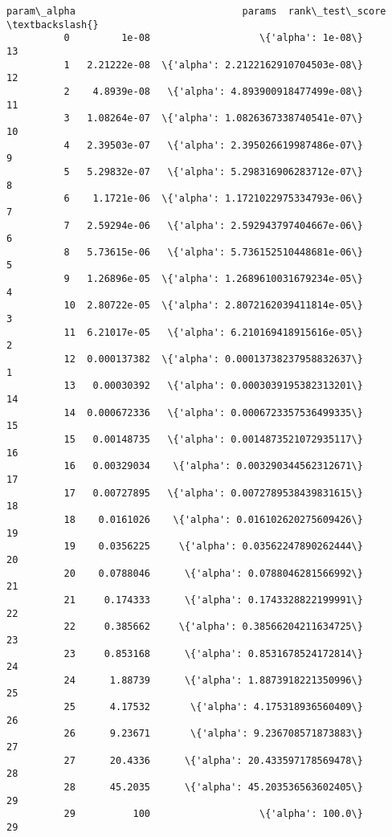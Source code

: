 \documentclass[11pt]{article}
\begin{document}
\begin{Verbatim}[commandchars=\\\{\}]
              param\_alpha                             params  rank\_test\_score  \textbackslash{}
          0         1e-08                   \{'alpha': 1e-08\}               13   
          1   2.21222e-08  \{'alpha': 2.2122162910704503e-08\}               12   
          2    4.8939e-08   \{'alpha': 4.893900918477499e-08\}               11   
          3   1.08264e-07  \{'alpha': 1.0826367338740541e-07\}               10   
          4   2.39503e-07   \{'alpha': 2.395026619987486e-07\}                9   
          5   5.29832e-07   \{'alpha': 5.298316906283712e-07\}                8   
          6    1.1721e-06  \{'alpha': 1.1721022975334793e-06\}                7   
          7   2.59294e-06   \{'alpha': 2.592943797404667e-06\}                6   
          8   5.73615e-06   \{'alpha': 5.736152510448681e-06\}                5   
          9   1.26896e-05  \{'alpha': 1.2689610031679234e-05\}                4   
          10  2.80722e-05  \{'alpha': 2.8072162039411814e-05\}                3   
          11  6.21017e-05   \{'alpha': 6.210169418915616e-05\}                2   
          12  0.000137382  \{'alpha': 0.00013738237958832637\}                1   
          13   0.00030392   \{'alpha': 0.0003039195382313201\}               14   
          14  0.000672336   \{'alpha': 0.0006723357536499335\}               15   
          15   0.00148735   \{'alpha': 0.0014873521072935117\}               16   
          16   0.00329034    \{'alpha': 0.003290344562312671\}               17   
          17   0.00727895   \{'alpha': 0.0072789538439831615\}               18   
          18    0.0161026    \{'alpha': 0.016102620275609426\}               19   
          19    0.0356225     \{'alpha': 0.03562247890262444\}               20   
          20    0.0788046      \{'alpha': 0.0788046281566992\}               21   
          21     0.174333      \{'alpha': 0.1743328822199991\}               22   
          22     0.385662     \{'alpha': 0.38566204211634725\}               23   
          23     0.853168      \{'alpha': 0.8531678524172814\}               24   
          24      1.88739      \{'alpha': 1.8873918221350996\}               25   
          25      4.17532       \{'alpha': 4.175318936560409\}               26   
          26      9.23671       \{'alpha': 9.236708571873883\}               27   
          27      20.4336      \{'alpha': 20.433597178569478\}               28   
          28      45.2035      \{'alpha': 45.203536563602405\}               29   
          29          100                   \{'alpha': 100.0\}               29   
          

\end{Verbatim}
\end{document}
